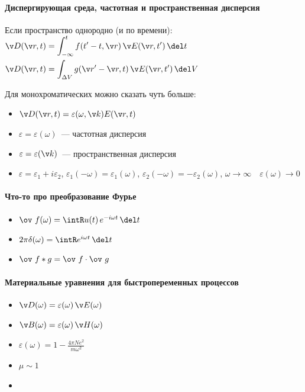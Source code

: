 \documentclass{trchesh}
\begin{document}
\begin{multicols*}{3}
\paragraph{Диспергирующая среда, частотная и пространственная дисперсия}
Если пространство однородно (и по времени): \\
$\begin{aligned}
  \v D (\v r,t) &= \int_{-\infty}^t f (t' - t, \v r)\,\v E(\v r, t')\, \del t \\
  \v D (\v r,t) &= \int_{\Delta V} g(\v r' -\v r, t)\,\v E(\v r, t')\, \del V
\end{aligned}$\par\vspace{1ex}
Для монохроматических можно сказать  чуть  больше:
\begin{itemize}
  \item $\v D(\v r,t) = \varepsilon (\omega,\v k) E(\v r,t)$
  \item $\varepsilon = \varepsilon(\omega)$~--- частотная дисперсия
  \item $\varepsilon = \varepsilon(\v k)$~--- пространственная дисперсия
  \item $\varepsilon = \varepsilon_1 + i \varepsilon _2$, 
    $\varepsilon_1(-\omega) = \varepsilon_1(\omega)$, $\varepsilon_2(-\omega) = -\varepsilon_2(\omega)$,
    $\omega \to \infty \quad \varepsilon(\omega) \to 0$
\end{itemize}

\paragraph{Что-то про преобразование Фурье}
\begin{itemize}
  \item $\ov~f(\omega) = \intR u(t)\, e^{-i \omega t} \, \del t$
  \item $2 \pi \delta(\omega) = \intR e^{i \omega t} \, \del t$
  \item $\ov~{f\ast g} = \ov~{f} \cdot \ov~{\vphantom{f}g}$
\end{itemize}

\paragraph{Материальные уравнения для быстропеременных процессов}
\begin{itemize}
  \item $\v D(\omega) = \varepsilon(\omega) \, \v E(\omega)$
  \item $\v B(\omega) = \varepsilon(\omega) \, \v H(\omega)$
  \item $\varepsilon (\omega) = 1 - \frac{4 \pi N e^2}{m \omega^2}$
  \item $\mu \sim 1$
  \item \underdev
\end{itemize}


\end{multicols*}
\end{document}
